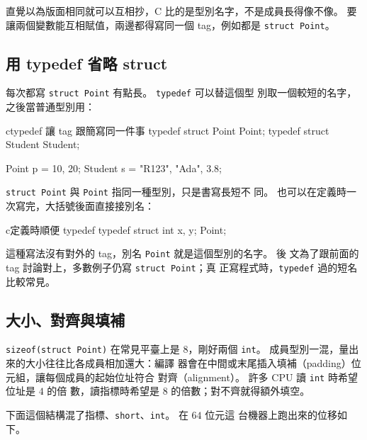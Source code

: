 直覺以為版面相同就可以互相抄，C 比的是型別名字，不是成員長得像不像。
要讓兩個變數能互相賦值，兩邊都得寫同一個 tag，例如都是
\texttt{struct Point}。

\subsection{用 typedef 省略 struct}

每次都寫 \texttt{struct Point} 有點長。 \texttt{typedef} 可以替這個型
別取一個較短的名字，之後當普通型別用：

\begin{code}{c}{typedef 讓 tag 跟簡寫同一件事}
typedef struct Point Point;
typedef struct Student Student;

Point p = {10, 20};
Student s = {"R123", "Ada", 3.8};
\end{code}

\texttt{struct Point} 與 \texttt{Point} 指同一種型別，只是書寫長短不
同。 也可以在定義時一次寫完，大括號後面直接接別名：

\begin{code}{c}{定義時順便 typedef}
typedef struct {
    int x, y;
} Point;
\end{code}

這種寫法沒有對外的 tag，別名 \texttt{Point} 就是這個型別的名字。 後
文為了跟前面的 tag 討論對上，多數例子仍寫 \texttt{struct Point}；真
正寫程式時，\texttt{typedef} 過的短名比較常見。

\subsection{大小、對齊與填補}

\texttt{sizeof(struct Point)} 在常見平臺上是 $8$，剛好兩個
\texttt{int}。 成員型別一混，量出來的大小往往比各成員相加還大：編譯
器會在中間或末尾插入填補（padding）位元組，讓每個成員的起始位址符合
對齊（alignment）。 許多 CPU 讀 \texttt{int} 時希望位址是 $4$ 的倍
數，讀指標時希望是 $8$ 的倍數；對不齊就得額外填空。

下面這個結構混了指標、\texttt{short}、\texttt{int}。 在 $64$ 位元這
台機器上跑出來的位移如下。

